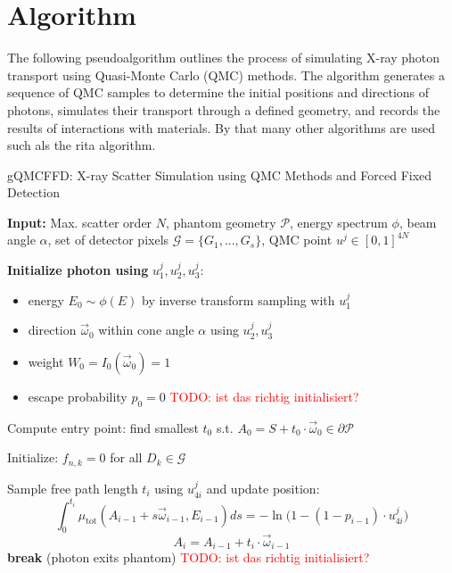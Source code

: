 \section{Algorithm}
The following pseudoalgorithm outlines the process of simulating X-ray photon transport using Quasi-Monte Carlo (QMC) methods. The algorithm generates a sequence of QMC samples to determine the initial positions and directions of photons, simulates their transport through a defined geometry, and records the results of interactions with materials. By that many other algorithms are used such als the \ac{rita} algorithm.
\begin{algorithm}[H]
\caption{gQMCFFD: X-ray Scatter Simulation using QMC Methods and Forced Fixed Detection}
\begin{algorithmic}[1]
\State \textbf{Input:} Max. scatter order $N$, phantom geometry $\mathcal{P}$, energy spectrum $\phi$, beam angle $\alpha$, set of detector pixels $\mathcal{G}=\{G_1, ..., G_s\}$, QMC point $u^j \in [0,1]^{4N}$
\vspace{.25cm}

\State \textbf{Initialize photon using } $u^j_1, u^j_2, u^j_3$:
\begin{itemize}
    \item energy $E_0 \sim \phi(E)$ by inverse transform sampling with $u^j_1$
    \item direction $\vec{\omega}_0$ within cone angle $\alpha$ using $u^j_2, u^j_3$
    \item weight $W_0 = I_0(\vec{\omega}_0) = 1$
    \item escape probability $p_0 = 0$ \textcolor{red}{TODO: ist das richtig initialisiert?}
    \end{itemize}
    \State Compute entry point: find smallest $t_0$ s.t. $A_0 = S + t_0 \cdot \vec{\omega}_0 \in \partial\mathcal{P}$

\vspace{.25cm}
\State Initialize: $f_{n,k} = 0$ for all $D_k \in \mathcal{G}$

    \State Sample free path length $t_i$ using $u^j_{4i}$ and update position:
    $$\int_0^{t_i} \mu_{\text{tot}}(A_{i-1} + s\vec{\omega}_{i-1}, E_{i-1}) ds = -\ln{\big(1 - (1 - p_{i-1}) \cdot u^j_{4i} \big)}$$
    $$A_i = A_{i-1} + t_i \cdot \vec{\omega}_{i-1}$$
        \State \textbf{break} (photon exits phantom) \textcolor{red}{TODO: ist das richtig initialisiert?}
    \EndIf


\end{algorithmic}
\end{algorithm}
